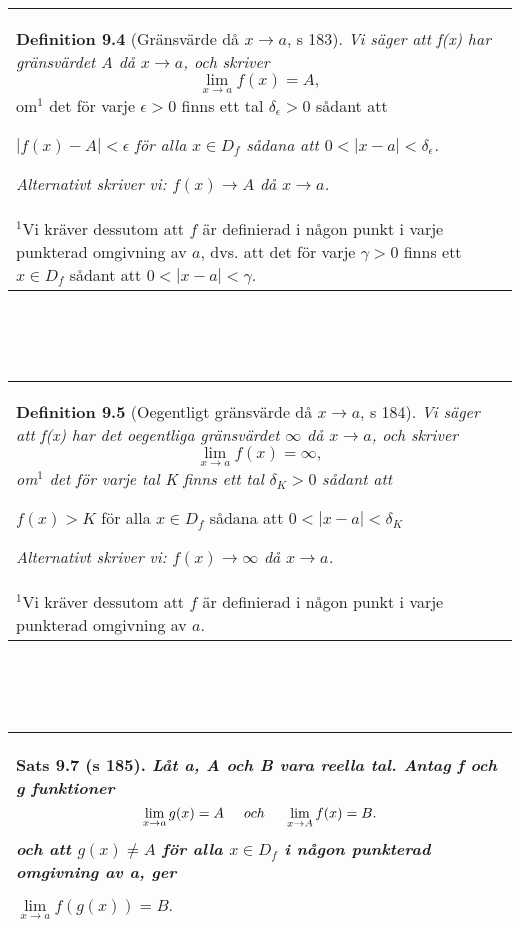 \documentclass[a4paper]{article}
\begin{document}
\begin{tabular}{|L{11.5cm}|} \hline
\textbf{Definition 9.4} (Gränsvärde då $x\rightarrow a$, s 183).
\textit{Vi säger att f(x) har gränsvärdet A då $x\rightarrow a$, och skriver}
\begin{displaymath}
\lim_{x\rightarrow a} f(x) = A,
\end{displaymath}
om$^1$ det för varje $\epsilon > 0$ finns ett tal $\delta_\epsilon > 0$ sådant att
\begin{center}
\textit{$|f(x)-A| < \epsilon$ \hspace{0.2cm} för alla $x \in D_f$ sådana att $0 < |x - a| < \delta_\epsilon$.}
\end{center}
\textit{Alternativt skriver vi: $f(x)\rightarrow A$ då $x\rightarrow a$.}
\\
\scriptsize{$^1$Vi kräver dessutom att $f$ är definierad i någon punkt i varje punkterad omgivning av $a$, dvs. att det för varje $\gamma > 0$ finns ett $x\in D_f$ sådant att $0<|x-a|<\gamma$.}
\\\hline
\end{tabular}
\\\\\\
\begin{tabular}{|L{11.5cm}|} \hline
\textbf{Definition 9.5} (Oegentligt gränsvärde då $x\rightarrow a$, s 184).
\textit{Vi säger att f(x) har det oegentliga gränsvärdet $\infty$ då $x\rightarrow a$, och skriver}
\begin{displaymath}
\lim_{x\rightarrow a} f(x) = \infty,
\end{displaymath}
\textit{om$^1$ det för varje tal K finns ett tal $\delta_K > 0$ sådant att}
\begin{center}
$f(x)>K$ \hspace{0.5cm} för alla $x\in D_f$ sådana att $0<|x-a|<\delta_K$
\end{center}
\textit{Alternativt skriver vi: $f(x)\rightarrow \infty$ då $x\rightarrow a$.} \\
\scriptsize{$^1$Vi kräver dessutom att $f$ är definierad i någon punkt i varje punkterad omgivning av $a$.}
\\\hline
\end{tabular}
\\\\\\
\begin{tabular}{|L{11.5cm}|} \hline
\textbf{Sats 9.7} (s 185).
\textit{Låt a, A och B vara reella tal. Antag f och g funktioner}
\begin{displaymath}
\lim_{x\rightarrow a} g(x) = A \hspace{0.5cm} och \hspace{0.5cm} \lim_{x\rightarrow A} f(x) = B.
\end{displaymath}
\textit{och att $g(x)\neq A$ för alla $x\in D_f$ i någon punkterad omgivning av a, ger}
\begin{center}
$\lim\limits_{x\rightarrow a} f(g(x)) = B. $
\end{center}
\\\hline
\end{tabular}
\end{document}
